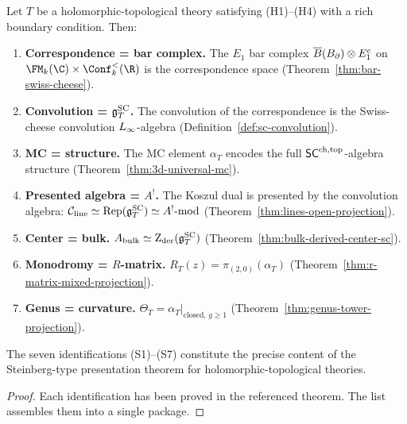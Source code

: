 \begin{theorem}
Let $T$ be a holomorphic-topological theory satisfying
\textup{(H1)--(H4)} with a rich boundary condition. Then:
\begin{enumerate}[label=\textup{(S\arabic*)},leftmargin=2.2em]
\item \textbf{Correspondence = bar complex.}
The $E_1$ bar complex
$\overline{B}(B_{\partial})\otimes E_1^c$
on $\FM_k(\C)\times\Conf_k^{<}(\R)$
is the correspondence space
\textup{(}Theorem~\textup{\ref{thm:bar-swiss-cheese}}\textup{)}.

\item \textbf{Convolution = $\mathfrak{g}^{\mathrm{SC}}_T$.}
The convolution of the correspondence is the Swiss-cheese
convolution $L_\infty$-algebra
\textup{(}Definition~\textup{\ref{def:sc-convolution}}\textup{)}.

\item \textbf{MC = structure.}
The MC element $\alpha_T$ encodes the full $\mathsf{SC}^{\mathrm{ch,top}}$-algebra
structure
\textup{(}Theorem~\textup{\ref{thm:3d-universal-mc}}\textup{)}.

\item \textbf{Presented algebra = $A^!$.}
The Koszul dual is presented by the convolution algebra:
$\mathcal C_{\mathrm{line}}\simeq\mathrm{Rep}(\mathfrak{g}^{\mathrm{SC}}_T)\simeq A^!\text{-mod}$
\textup{(}Theorem~\textup{\ref{thm:lines-open-projection}}\textup{)}.

\item \textbf{Center = bulk.}
$A_{\mathrm{bulk}}\simeq\operatorname{Z}_{\mathrm{der}}(\mathfrak{g}^{\mathrm{SC}}_T)$
\textup{(}Theorem~\textup{\ref{thm:bulk-derived-center-sc}}\textup{)}.

\item \textbf{Monodromy = $R$-matrix.}
$R_T(z)=\pi_{(2,0)}(\alpha_T)$
\textup{(}Theorem~\textup{\ref{thm:r-matrix-mixed-projection}}\textup{)}.

\item \textbf{Genus = curvature.}
$\Theta_T=\alpha_T|_{\mathrm{closed},\,g\ge 1}$
\textup{(}Theorem~\textup{\ref{thm:genus-tower-projection}}\textup{)}.
\end{enumerate}
The seven identifications \textup{(S1)--(S7)} constitute the
precise content of the Steinberg-type presentation theorem for
holomorphic-topological theories.
\end{theorem}

\begin{proof}
Each identification has been proved in the referenced theorem.
The list assembles them into a single package.
\end{proof}

